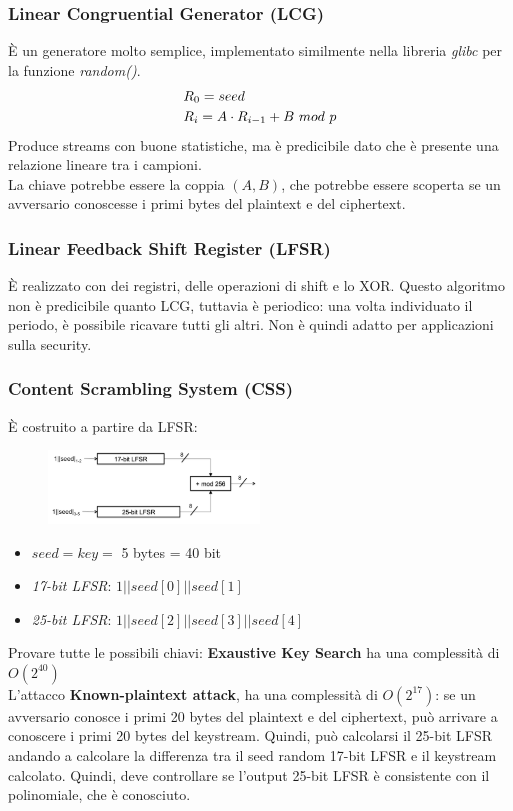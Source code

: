\documentclass[a4paper,12pt]{article}
\begin{document}
\subsubsection{Linear Congruential Generator (LCG)}
È un generatore molto semplice, implementato similmente nella libreria \textit{glibc} per la funzione \textit{random()}.
\begin{align}
& R_0 = seed \notag \\
& R_i = A \cdot R_{i-1} + B\ mod\ p \notag
\end{align}
Produce streams con buone statistiche, ma è predicibile dato che è presente una relazione lineare tra i campioni. \\
La chiave potrebbe essere la coppia $(A,B)$, che potrebbe essere scoperta se un avversario conoscesse i primi bytes del plaintext e del ciphertext.

\subsubsection{Linear Feedback Shift Register (LFSR)}
È realizzato con dei registri, delle operazioni di shift e lo XOR. Questo algoritmo non è predicibile quanto LCG, tuttavia è periodico: una volta individuato il periodo, è possibile ricavare tutti gli altri.
Non è quindi adatto per applicazioni sulla security.

\subsubsection{Content Scrambling System (CSS)}
È costruito a partire da LFSR:
\begin{figure}[H]
  \centering
  \includegraphics[width=0.5\textwidth]{img/css}
\end{figure}
\begin{itemize}
	\item $seed = key =$ 5 bytes = 40 bit 
	\item \textit{17-bit LFSR}: $1||seed[0]||seed[1]$
	\item \textit{25-bit LFSR}: $1||seed[2]||seed[3]||seed[4]$
\end{itemize}
Provare tutte le possibili chiavi: \textbf{Exaustive Key Search} ha una complessità di $O(2^{40})$ \\
L'attacco \textbf{Known-plaintext attack}, ha una complessità di $O(2^{17})$: se un avversario conosce i primi 20 bytes del plaintext e del ciphertext, può arrivare a conoscere i primi 20 bytes del keystream. Quindi, può calcolarsi il 25-bit LFSR andando a calcolare la differenza tra il seed random 17-bit LFSR e il keystream calcolato. Quindi, deve controllare se l'output 25-bit LFSR è consistente con il polinomiale, che è conosciuto.
\end{document}

